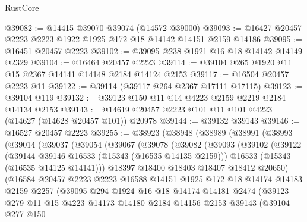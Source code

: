 \begin{lexlean}{RustCore}
\begin{coremodule}
@39082 := @14415 @39070 @39074 (@14572 @39000)
@39093 := @16427 @20457 @2223 @2223 @1922 @1925 @172 @18 @14142 @14151 @2159 @14186
@39095 := @16451 @20457 @2223
@39102 := @39095 @238 @1921 @16 @18 @14142 @14149 @2329
@39104 := @16464 @20457 @2223
@39114 := @39104 @265 @1920 @11 @15 @2367 @14141 @14148 @2184 @14124 @2153
@39117 := @16504 @20457 @2223 @11
@39122 := @39114 (@39117 @264 @2367 @17111 @17115)
@39123 := @39104 @119
@39132 := @39123 @150 @11 @14 @4223 @2159 @2219 @2184 @14134 @2153
@39143 := @14619 @20457 @2223 @101 @11 @101 @4223 (@14627 (@14628 @20457 @101)) @20978
@39144 := @39132 @39143
@39146 := @16527 @20457 @2223
@39255 := @38923
    (@38948
      (@38989
        (@38991
          (@38993
            (@39014
              (@39037
                (@39054
                  (@39067
                    (@39078
                      (@39082
                        (@39093
                          (@39102
                            (@39122
                              (@39144 @39146 @16533 (@15343 (@16535 @14135 @2159)))
                              @16533
                              (@15343 (@16535 @14125 @14141)))
                            @18397
                            @18400
                            @18403
                            @18407
                            @18412
                            @20650)
                          (@16584
                            @20457
                            @2223
                            @2223
                            @16588
                            @14151
                            @1925
                            @172
                            @18
                            @14174
                            @14183
                            @2159
                            @2257
                            (@39095
                              @294
                              @1924
                              @16
                              @18
                              @14174
                              @14181
                              @2474
                              (@39123
                                @279
                                @11
                                @15
                                @4223
                                @14173
                                @14180
                                @2184
                                @14156
                                @2153
                                @39143
                                (@39104
                                  @277
                                  @150

\end{coremodule}
\end{lexlean}
